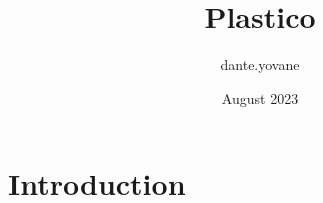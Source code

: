 \documentclass{article}
\title{Plastico}
\author{dante.yovane }
\date{August 2023}
\begin{document}
\maketitle

\section{Introduction}
\end{document}
